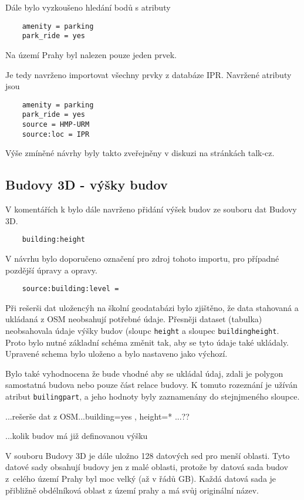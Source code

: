 Dále bylo vyzkoušeno hledání bodů s atributy 
\begin{verbatim}
    amenity = parking
    park_ride = yes
\end{verbatim}
Na území Prahy byl nalezen pouze jeden prvek.

Je tedy navrženo importovat všechny prvky z databáze IPR.
Navržené atributy jsou
\begin{verbatim}
    amenity = parking
    park_ride = yes
    source = HMP-URM
    source:loc = IPR
\end{verbatim}


Výše zmíněné návrhy byly takto zveřejněny v diskuzi na stránkách talk-cz.

\subsection{Budovy 3D - výšky budov}
\label{Budovy 3D - výšky budov}
V komentářích k bylo dále navrženo přidání výšek budov ze souboru dat Budovy 3D.
\begin{verbatim}
    building:height
\end{verbatim}
V návrhu bylo doporučeno označení pro zdroj tohoto importu, pro případné pozdější úpravy a opravy.
\begin{verbatim}
    source:building:level =
\end{verbatim}

Při rešerši dat uložencýh na školní geodatabázi bylo zjištěno,
že data stahovaná a ukládaná z OSM neobsahují potřebné údaje.
Přesněji dataset (tabulka) neobsahovala údaje výšky budov
(sloupc {\tt height} a sloupec {\tt building\:height}.
Proto bylo nutné základní schéma změnit tak, aby se tyto údaje také ukládaly.
Upravené schema bylo uloženo a bylo nastaveno jako výchozí.

Bylo také vyhodnocena že bude vhodné aby se ukládal údaj, zdali
je polygon samostatná budova nebo pouze část relace budovy.
K tomuto rozeznání je užíván atribut {\tt builing\:part},
a jeho hodnoty byly zaznamenány do stejnjmeného sloupce.

...rešerše dat z OSM...{building=yes , height=*} ...??

...kolik budov má již definovanou výšku

V souboru Budovy 3D je dále uložno 128 datových sed pro menší oblasti.
Tyto datové sady obsahují budovy jen z malé oblasti, protože by datová sada budov
z~celého území Prahy byl moc velký (až v řádů GB).
Každá datová sada je přibližně obdélníková oblast z území prahy
a má svůj originální název.

